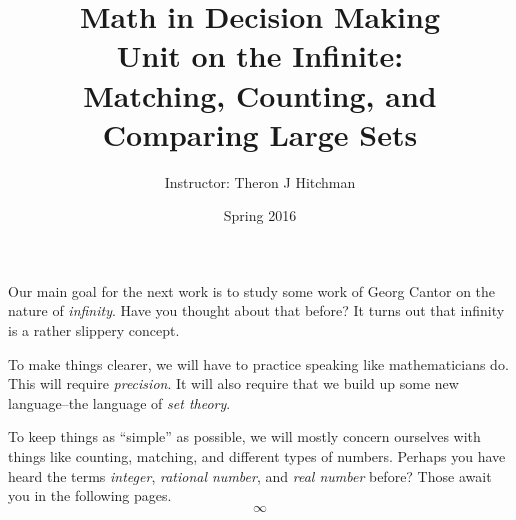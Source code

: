 \documentclass[12pt]{article}
\begin{document}
\title{Math in Decision Making\\ Unit on the Infinite:\\
Matching, Counting, and Comparing Large Sets}
\author{Instructor: Theron J Hitchman}
\date{Spring 2016}


\maketitle

Our main goal for the next work is to study some work of Georg Cantor on the nature of \emph{infinity}. Have you thought about that before? It turns out that infinity is a rather slippery concept. 

To make things clearer, we will have to practice speaking like mathematicians do. This will require \emph{precision}. It will also require that we build up some new language--the language of \emph{set theory}.

To keep things as ``simple'' as possible, we will mostly concern ourselves with things like counting, matching, and different types of numbers. Perhaps you have heard the terms \emph{integer}, \emph{rational number}, and \emph{real number} before? Those await you in the following pages.\\

\[
\infty
\]

\newpage
$\phantom{Theron J Hitchman}$
\newpage

$\phantom{Theron J Hitchman}$
\newpage

\newpage
$\phantom{Theron J Hitchman}$
\newpage


\newpage
$\phantom{Theron J Hitchman}$
\newpage

\newpage
$\phantom{Theron J Hitchman}$
\newpage

\newpage
$\phantom{Theron J Hitchman}$
\newpage

\newpage
$\phantom{Theron J Hitchman}$
\newpage

\newpage
$\phantom{Theron J Hitchman}$
\newpage



\newpage
$\phantom{Theron J Hitchman}$
\newpage


\end{document}

